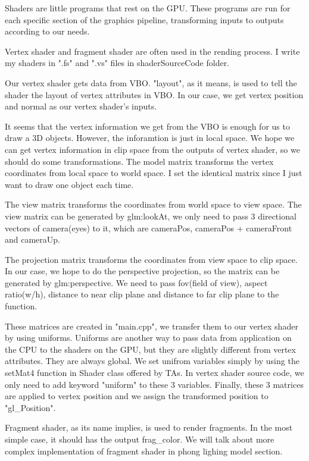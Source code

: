 \documentclass[acmtog]{acmart}
\begin{document}
Shaders are little programs that rest on the GPU. These programs are run for each specific section of the graphics pipeline, transforming inputs to outputs according to our needs.

Vertex shader and fragment shader are often used in the rending process. I write my shaders in ".fs" and ".vs" files in shaderSourceCode folder.

Our vertex shader gets data from VBO. "layout", as it means, is used to tell the shader the layout of vertex attributes in VBO. In our case, we get vertex position and normal as our vertex shader's inputs.

It seems that the vertex information we get from the VBO is enough for us to draw a 3D objects. However, the inforamtion is just in local space. We hope we can get vertex information in clip space from the outputs of vertex shader, so we should do some transformations.
The model matrix transforms the vertex coordinates from local space to world space. I set the identical matrix since I just want to draw one object each time.

The view matrix transforms the coordinates from world space to view space. The view matrix can be generated by glm:lookAt, we only need to pass 3 directional vectors of camera(eyes) to it, which are cameraPos, cameraPos + cameraFront and cameraUp.

The projection matrix transforms the coordinates from view space to clip space. In our case, we hope to do the perspective projection, so the matrix can be generated by glm:perspective. We need to pass fov(field of view), aspect ratio(w/h), distance to near clip plane and distance to far clip plane to the function.

These matrices are created in "main.cpp", we transfer them to our vertex shader by using uniforms. Uniforms are another way to pass data from application on the CPU to the shaders on the GPU, but they are slightly different from vertex attributes. They are always global. We set unifrom variables simply by using the setMat4 function in Shader class offered by TAs.
In vertex shader source code, we only need to add keyword "uniform" to these 3 variables.
Finally, these 3 matrices are applied to vertex position and we assign the transformed position to "gl\_Position".

Fragment shader, as its name implies, is used to render fragments. In the most simple case, it should has the output frag\_color. We will talk about more complex implementation of fragment shader in phong lighing model section.
\end{document}
